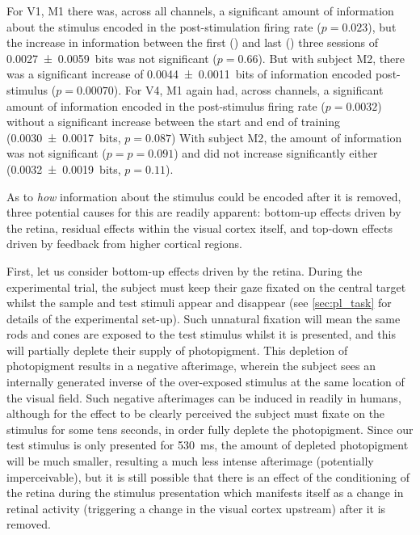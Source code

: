 For \ac{V1}, \ac{M1} there was, across all channels, a significant amount of information about the stimulus encoded in the post-stimulation firing rate ($p=0.023$), but the increase in information between the first () and last () three sessions of \SI{0.0027\pm0.0059}{bits} was not significant ($p=0.66$).
But with subject \ac{M2}, there was a significant increase of \SI{0.0044\pm0.0011}{bits} of information encoded post-stimulus ($p=0.00070$).
For \ac{V4}, \ac{M1} again had, across channels, a significant amount of information encoded in the post-stimulus firing rate ($p=0.0032$) without a significant increase between the start and end of training (\SI{+0.0030\pm0.0017}{bits}, $p=0.087$)
With subject \ac{M2}, the amount of information was not significant ($p=p=0.091$) and did not increase significantly either (\SI{+0.0032\pm0.0019}{bits}, $p=0.11$).


As to \textit{how} information about the stimulus could be encoded after it is removed, three potential causes for this are readily apparent: bottom-up effects driven by the retina, residual effects within the visual cortex itself, and top-down effects driven by feedback from higher cortical regions.

First, let us consider bottom-up effects driven by the retina.
During the experimental trial, the subject must keep their gaze fixated on the central target whilst the sample and test stimuli appear and disappear (see \autoref{sec:pl_task} for details of the experimental set-up).
Such unnatural fixation will mean the same rods and cones are exposed to the test stimulus whilst it is presented, and this will partially deplete their supply of photopigment.
This depletion of photopigment results in a negative afterimage, wherein the subject sees an internally generated inverse of the over-exposed stimulus at the same location of the visual field.
Such negative afterimages can be induced in readily in humans, although for the effect to be clearly perceived the subject must fixate on the stimulus for some tens seconds, in order fully deplete the photopigment.
Since our test stimulus is only presented for \SI{530}{\milli\second}, the amount of depleted photopigment will be much smaller, resulting a much less intense afterimage (potentially imperceivable), but it is still possible that there is an effect of the conditioning of the retina during the stimulus presentation which manifests itself as a change in retinal activity (triggering a change in the visual cortex upstream) after it is removed.

